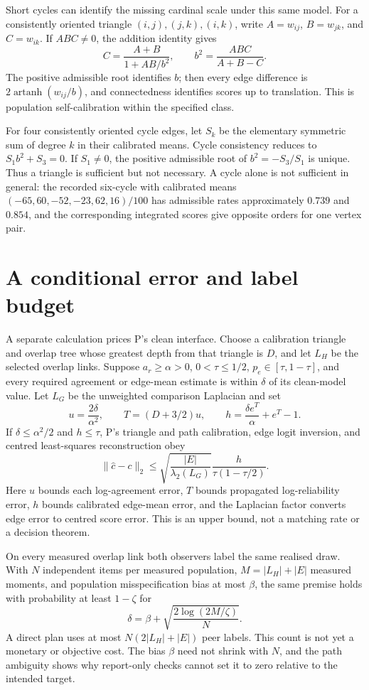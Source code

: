 \documentclass{article}
\begin{document}
Short cycles can identify the missing cardinal scale under this same model. For a consistently
oriented triangle \((i,j),(j,k),(i,k)\), write \(A=w_{ij}\), \(B=w_{jk}\), and \(C=w_{ik}\). If
\(ABC\ne0\), the addition identity gives
\[
C=\frac{A+B}{1+AB/b^2},
\qquad b^2=\frac{ABC}{A+B-C}.
\]
The positive admissible root identifies \(b\); then every edge difference is
\(2\operatorname{artanh}(w_{ij}/b)\), and connectedness identifies scores up to translation. This is
population self-calibration within the specified class. %

For four consistently oriented cycle edges, let \(S_k\) be the elementary symmetric sum of degree
\(k\) in their calibrated means. Cycle consistency reduces to \(S_1b^2+S_3=0\). If \(S_1\ne0\), the
positive admissible root of \(b^2=-S_3/S_1\) is unique. Thus a triangle is sufficient but not
necessary. %
A cycle alone is not sufficient in general: the recorded six-cycle with calibrated means
\((-65,60,-52,-23,62,16)/100\) has admissible rates approximately \(0.739\) and \(0.854\), and the
corresponding integrated scores give opposite orders for one vertex pair. %

\section{A conditional error and label budget}
A separate calculation prices P's clean interface. Choose a calibration triangle and overlap tree
whose greatest depth from that triangle is \(D\), and let \(L_H\) be the selected overlap links.
Suppose \(a_r\geq\alpha>0\), \(0<\tau\leq1/2\), \(p_e\in[\tau,1-\tau]\), and every required agreement or edge-mean
estimate is within \(\delta\) of its clean-model value. Let \(L_G\) be the unweighted comparison
Laplacian and set
\[
u=\frac{2\delta}{\alpha^2},\qquad
T=(D+3/2)u,\qquad
h=\frac{\delta e^T}{\alpha}+e^T-1.
\]
If \(\delta\leq\alpha^2/2\) and \(h\leq\tau\), P's triangle and path calibration, edge logit
inversion, and centred least-squares reconstruction obey
\[
\|\widehat c-c\|_2\leq
\sqrt{\frac{|E|}{\lambda_2(L_G)}}
\frac{h}{\tau(1-\tau/2)}.
\]
Here \(u\) bounds each log-agreement error, \(T\) bounds propagated log-reliability error, \(h\)
bounds calibrated edge-mean error, and the Laplacian factor converts edge error to centred score
error. This is an upper bound, not a matching rate or a decision theorem. %

On every measured overlap link both observers label the same realised draw.
With \(N\) independent items per measured population, \(M=|L_H|+|E|\) measured moments, and
population misspecification bias at most \(\beta\), the same premise holds with probability at least
\(1-\zeta\) for
\[
\delta=\beta+\sqrt{\frac{2\log(2M/\zeta)}{N}}.
\]
A direct plan uses at most \(N(2|L_H|+|E|)\) peer labels. This count is not yet a monetary or
objective cost. The bias \(\beta\) need not shrink with \(N\), and the path ambiguity shows why
report-only checks cannot set it to zero relative to the intended target. %
\end{document}
